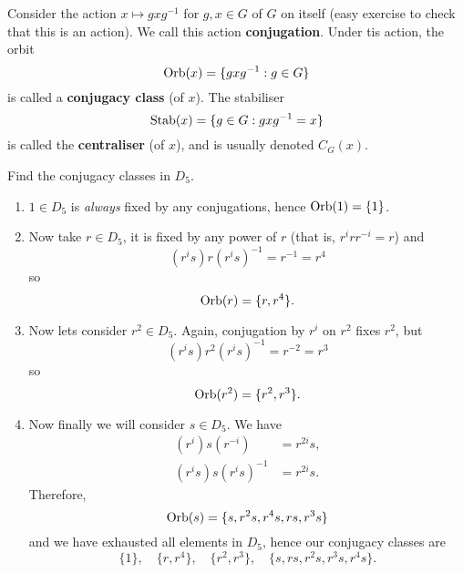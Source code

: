 Consider the action $x \mapsto gxg^{-1}$ for $g,x \in G$ of $G$ on itself
(easy exercise to check that this is an action).
We call this action \textbf{conjugation}.
Under tis action, the orbit
\[
    \operatorname{Orb}(x) = \{gxg^{-1}: g \in G\}
\]
is called a \textbf{conjugacy class} (of $x$).
The stabiliser
\[
    \operatorname{Stab}(x) = \{g \in G: gxg^{-1} = x\}
\]
is called the \textbf{centraliser} (of $x$), and is usually denoted $C_G(x)$.

\begin{example}
    Find the conjugacy classes in $D_5$.
\end{example}

\begin{solution}
    \hfill
    \begin{enumerate}
        \item 
            $1 \in D_5$ is \emph{always} fixed by any conjugations, 
            hence $\operatorname{Orb}(1) = \{1\}$.

        \item 
            Now take $r \in D_5$, it is fixed by any power of $r$
            (that is, $r^i r r^{-i} = r$)
            and
            \[
                (r^is) r (r^is)^{-1} = r^{-1} = r^4
            \]
            so
            \[
                \operatorname{Orb}(r) = \{r, r^4\}.
            \]

        \item 
            Now lets consider $r^2 \in D_5$. 
            Again, conjugation by $r^i$ on $r^2$ fixes $r^2$, but
            \[
                (r^is) r^2 (r^is)^{-1} = r^{-2} = r^3
            \]
            so 
            \[
                \operatorname{Orb}(r^2) = \{r^2, r^3\}.
            \]

        \item
            Now finally we will consider $s \in D_5$.
            We have
            \begin{align*}
                (r^i) s (r^{-i})     &= r^{2i}s, \\
                (r^is) s (r^is)^{-1} &= r^{2i}s.
            \end{align*}
            Therefore,
            \[
                \operatorname{Orb}(s) = \{s, r^2s, r^4s, rs, r^3s\}
            \]
            and we have exhausted all elements in $D_5$, 
            hence our conjugacy classes are
            \[
                \{1\}, \quad \{r, r^4\}, \quad \{r^2, r^3\}, \quad \{s, rs, r^2s, r^3s, r^4s\}.
            \]
    \end{enumerate}
\end{solution}

